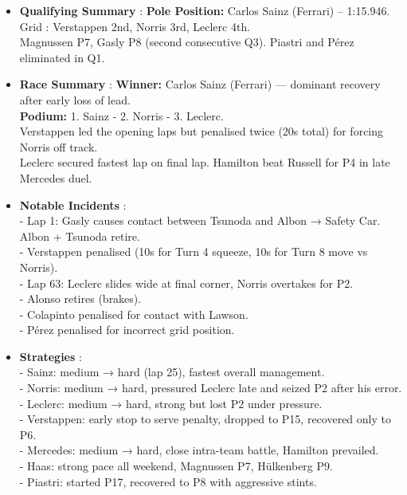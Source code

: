 \begin{itemize}
    \item \textbf{Qualifying Summary} : \textbf{Pole Position:} Carlos Sainz (Ferrari) – 1:15.946. \\
    Grid : Verstappen 2nd, Norris 3rd, Leclerc 4th. \\
    Magnussen P7, Gasly P8 (second consecutive Q3). Piastri and Pérez eliminated in Q1.
    
    \item \textbf{Race Summary} : \textbf{Winner:} Carlos Sainz (Ferrari) — dominant recovery after early loss of lead. \\
    \textbf{Podium:} 1. Sainz - 2. Norris - 3. Leclerc. \\
    Verstappen led the opening laps but penalised twice (20s total) for forcing Norris off track. \\
    Leclerc secured fastest lap on final lap. Hamilton beat Russell for P4 in late Mercedes duel. \\
    
    \item \textbf{Notable Incidents} : \\
    - Lap 1: Gasly causes contact between Tsunoda and Albon → Safety Car. Albon + Tsunoda retire. \\
    - Verstappen penalised (10s for Turn 4 squeeze, 10s for Turn 8 move vs Norris). \\
    - Lap 63: Leclerc slides wide at final corner, Norris overtakes for P2. \\
    - Alonso retires (brakes). \\
    - Colapinto penalised for contact with Lawson. \\
    - Pérez penalised for incorrect grid position.
    
    \item \textbf{Strategies} : \\
    - Sainz: medium → hard (lap 25), fastest overall management. \\
    - Norris: medium → hard, pressured Leclerc late and seized P2 after his error. \\
    - Leclerc: medium → hard, strong but lost P2 under pressure. \\
    - Verstappen: early stop to serve penalty, dropped to P15, recovered only to P6. \\
    - Mercedes: medium → hard, close intra-team battle, Hamilton prevailed. \\
    - Haas: strong pace all weekend, Magnussen P7, Hülkenberg P9. \\
    - Piastri: started P17, recovered to P8 with aggressive stints.
    

\end{itemize}
